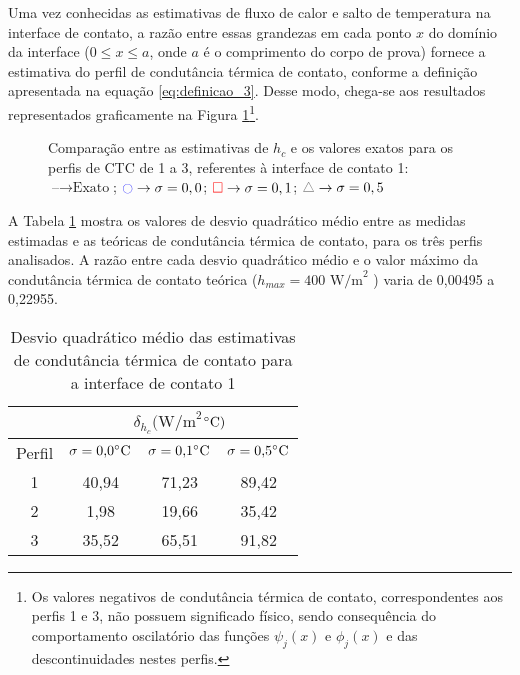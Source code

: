 Uma vez conhecidas as estimativas de fluxo de calor e salto de temperatura na interface de contato, a razão entre essas grandezas em cada ponto $x$ do domínio da interface ($0 \le x \le a$, onde $a$ é o comprimento do corpo de prova) fornece a estimativa do perfil de condutância térmica de contato, conforme a definição apresentada na equação \eqref{eq:definicao_3}. Desse modo, chega-se aos resultados representados graficamente na Figura \ref{figura_ctc_interface_01}\footnote{Os valores negativos de condutância térmica de contato, correspondentes aos perfis 1 e 3, não possuem significado físico, sendo consequência do comportamento oscilatório das funções $\psi_j(x)$ e $\phi_j(x)$ e das descontinuidades nestes perfis.}.
\begin{figure}[H]
	\caption{Comparação entre as estimativas de $h_c$ e os valores exatos para os perfis de CTC de 1 a 3, referentes à interface de contato 1: $\text{--} \rightarrow \text{Exato}$; $\textcolor{blue}{\ocircle} \rightarrow \sigma = 0,0$; $\textcolor{red}{\square} \rightarrow \sigma = 0,1$; $\textcolor{gray}{\triangle} \rightarrow \sigma = 0,5$}
	\label{figura_ctc_interface_01}
\end{figure}

A Tabela \ref{tabela_rms_ctc_interface_1} mostra os valores de desvio quadrático médio entre as medidas estimadas e as teóricas de condutância térmica de contato, para os três perfis analisados. A razão entre cada desvio quadrático médio e o valor máximo da condutância térmica de contato teórica ($h_{max} = 400 \text{ W/m}^2$ \celsius) varia de 0,00495 a 0,22955.
\begin{table}[H]
	\centering
	\caption{Desvio quadrático médio das estimativas de condutância térmica de contato para a interface de contato 1}
	\begin{tabular}{c|c|c|c|}
		\cline{2-4}
		& \multicolumn{3}{c|}{$\delta_{h_c}(\text{W/m}^{2}$$\celsius)$} \\ \hline
		\multicolumn{1}{|c|}{Perfil} & $\sigma = \text{0,0}\celsius$   & $\sigma = \text{0,1}\celsius$    & $\sigma = \text{0,5}\celsius$  \\ \hline
		\multicolumn{1}{|c|}{1}      & 40,94       & 71,23           & 89,42       \\ \hline
		\multicolumn{1}{|c|}{2}      & 1,98       &  19,66      &   35,42    \\ \hline
		\multicolumn{1}{|c|}{3}      & 35,52            &  65,51      & 91,82      \\ \hline
	\end{tabular}
	\label{tabela_rms_ctc_interface_1}
\end{table}

